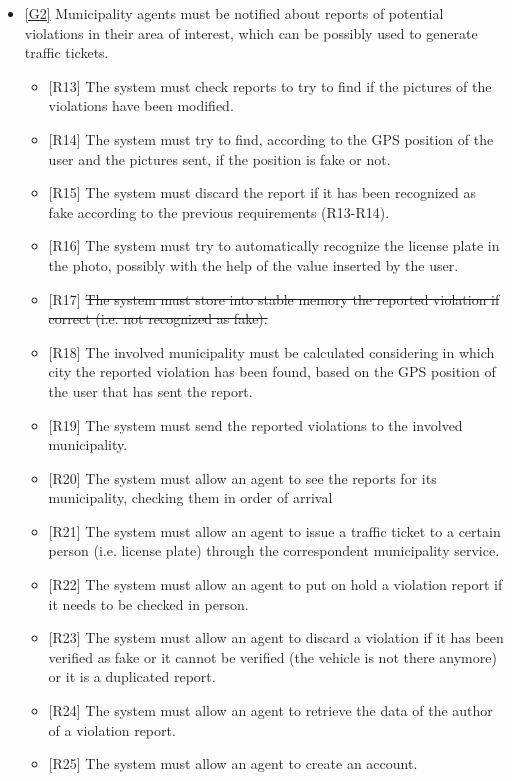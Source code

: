 \documentclass[a4paper]{report}
\begin{document}
\begin{itemize}
\begin{itemize}
\end{itemize}
\item \hyperref[G2]{[G2]} Municipality agents must be notified about reports of potential violations in their area of interest, which can be possibly used to generate traffic tickets.	
\begin{itemize}
\item {[R13]}	\label{R13}The system must check reports to try to find if the pictures of the violations have been modified.
\item {[R14]}	\label{R14}The system must try to find, according to the GPS position of the user and the pictures sent, if the position is fake or not.
\item {[R15]}	\label{R15}The system must discard the report if it has been recognized as fake according to the previous requirements (R13-R14).
\item {[R16]}	\label{R16}The system must try to automatically recognize the license plate in the photo, possibly with the help of the value inserted by the user.
\item {[R17]}	\st{The system must store into stable memory the reported violation if correct (i.e. not recognized as fake). }
\item {[R18]}	\label{R18}The involved municipality must be calculated considering in which city the reported violation has been found, based on the GPS position of the user that has sent the report.
\item {[R19]}	\label{R19}The system must send the reported violations to the involved municipality.
\item {[R20]}   \label{R20}The system must allow an agent to see the reports for its municipality, checking them in order of arrival
\item {[R21]}	\label{R21}The system must allow an agent to issue a traffic ticket to a certain person (i.e. license plate) through the correspondent municipality service.
\item {[R22]}	\label{R22}The system must allow an agent to put on hold a violation report if it needs to be checked in person.
\item {[R23]}	\label{R23}\label{R20}The system must allow an agent to discard a violation if it has been verified as fake or it cannot be verified (the vehicle is not there anymore) or it is a duplicated report.
\item {[R24]}	\label{R24}The system must allow an agent to retrieve the data of the author of a violation report.
\item {[R25]}	\label{R25}The system must allow an agent to create an account.

\end{itemize}
\end{itemize}
\end{document}
